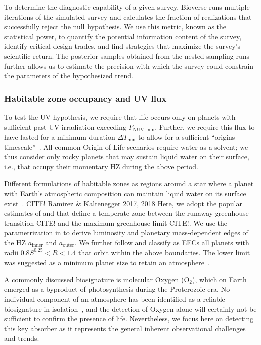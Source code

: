 \documentclass[twocolumn,twocolappendix,linenumbers]{aastex631}
\begin{document}
\begin{enumerate}
To determine the diagnostic capability of a given survey, Bioverse runs multiple iterations of the simulated survey and calculates the fraction of realizations that successfully reject the null hypothesis.
We use this metric, known as the statistical power, to quantify the potential information content of the survey, identify critical design trades, and find strategies that maximize the survey's scientific return.
The posterior samples obtained from the nested sampling runs further allows us to estimate the precision with which the survey could constrain the parameters of the hypothesized trend.
\end{enumerate}



\subsubsection{Habitable zone occupancy and UV flux}
To test the UV hypothesis, we require that life occurs only on planets with sufficient past UV irradiation exceeding $F_\mathrm{NUV, min}$.
Further, we require this flux to have lasted for a minimum duration $\Delta T_\mathrm{min}$ to allow for a sufficient ``origins timescale''~\citep{Rimmer2023}.
All common Origin of Life scenarios require water as a solvent;
we thus consider only rocky planets that may sustain liquid water on their surface, i.e., that occupy their momentary \gls{HZ} during the above period.

Different formulations of habitable zones as regions around a star where a planet with Earth's atmospheric composition can maintain liquid water on its surface exist~\citep[e.g.,][]{MolLous2022,Spinelli2023,Tuchow2023}. CITE! Ramirez \& Kaltenegger 2017, 2018
Here, we adopt the popular estimates of \citet{Kasting1993} and \citet{Kopparapu2013,Kopparapu2014} that define a temperate zone between the runaway greenhouse transition CITE! and the maximum greenhouse limit CITE!.
We use the parametrization in \citet{Kopparapu2014} to derive luminosity and planetary mass-dependent edges of the \gls{HZ} $a_\mathrm{inner}$ and $a_\mathrm{outer}$.
We further follow \citet{Bixel2021} and classify as \glspl{EEC} all planets with radii $0.8 S^{0.25} < R < 1.4 $ that orbit within the above boundaries.
The lower limit was suggested as a minimum planet size to retain an atmosphere~\citep{Zahnle2017}.

A commonly discussed biosignature is molecular Oxygen (O$_2$), which on Earth emerged as a byproduct of photosynthesis during the Proterozoic era.
No individual component of an atmosphere has been identified as a reliable biosignature in isolation~\citep{Seager2016}, and the detection of Oxygen alone will certainly not be sufficient to confirm the presence of life.
Nevertheless, we focus here on detecting this key absorber as it represents the general inherent observational challenges and trends.
\end{document}
